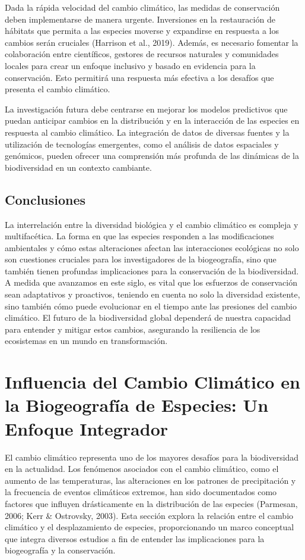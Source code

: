 \documentclass[
  letterpaper,
  DIV=11,
  numbers=noendperiod,
  oneside]{scrreprt}
\begin{document}
Dada la rápida velocidad del cambio climático, las medidas de
conservación deben implementarse de manera urgente. Inversiones en la
restauración de hábitats que permita a las especies moverse y expandirse
en respuesta a los cambios serán cruciales (Harrison et al., 2019).
Además, es necesario fomentar la colaboración entre científicos,
gestores de recursos naturales y comunidades locales para crear un
enfoque inclusivo y basado en evidencia para la conservación. Esto
permitirá una respuesta más efectiva a los desafíos que presenta el
cambio climático.

La investigación futura debe centrarse en mejorar los modelos
predictivos que puedan anticipar cambios en la distribución y en la
interacción de las especies en respuesta al cambio climático. La
integración de datos de diversas fuentes y la utilización de tecnologías
emergentes, como el análisis de datos espaciales y genómicos, pueden
ofrecer una comprensión más profunda de las dinámicas de la
biodiversidad en un contexto cambiante.

\section{Conclusiones}\label{conclusiones-6}

La interrelación entre la diversidad biológica y el cambio climático es
compleja y multifacética. La forma en que las especies responden a las
modificaciones ambientales y cómo estas alteraciones afectan las
interacciones ecológicas no solo son cuestiones cruciales para los
investigadores de la biogeografía, sino que también tienen profundas
implicaciones para la conservación de la biodiversidad. A medida que
avanzamos en este siglo, es vital que los esfuerzos de conservación sean
adaptativos y proactivos, teniendo en cuenta no solo la diversidad
existente, sino también cómo puede evolucionar en el tiempo ante las
presiones del cambio climático. El futuro de la biodiversidad global
dependerá de nuestra capacidad para entender y mitigar estos cambios,
asegurando la resiliencia de los ecosistemas en un mundo en
transformación.

\chapter{Influencia del Cambio Climático en la Biogeografía de Especies:
Un Enfoque
Integrador}\label{influencia-del-cambio-climuxe1tico-en-la-biogeografuxeda-de-especies-un-enfoque-integrador}

El cambio climático representa uno de los mayores desafíos para la
biodiversidad en la actualidad. Los fenómenos asociados con el cambio
climático, como el aumento de las temperaturas, las alteraciones en los
patrones de precipitación y la frecuencia de eventos climáticos
extremos, han sido documentados como factores que influyen drásticamente
en la distribución de las especies (Parmesan, 2006; Kerr \& Ostrovsky,
2003). Esta sección explora la relación entre el cambio climático y el
desplazamiento de especies, proporcionando un marco conceptual que
integra diversos estudios a fin de entender las implicaciones para la
biogeografía y la conservación.
\end{document}
